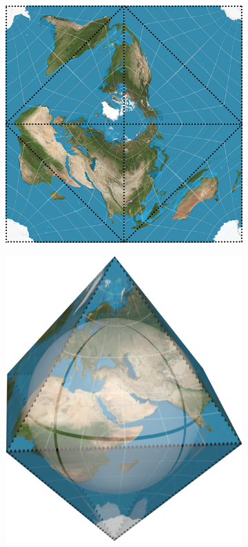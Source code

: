 \begin{figure}[htbp]
    \centering
    \begin{subfigure}[bt]{0.3\textwidth}
        \includegraphics[width=\textwidth]{figures/developable_projected/toast.png}
    \end{subfigure}
    \qquad
    \begin{subfigure}[bt]{0.2\textwidth}
        \includegraphics[width=\textwidth]{figures/map_projection/projection_toast.png}

\end{subfigure}
\end{figure}
